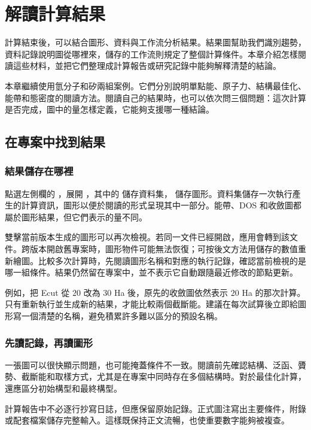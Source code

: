 \chapter{解讀計算結果}\label{ch:results}

計算結束後，可以結合圖形、資料與工作流分析結果。結果圖幫助我們識別趨勢，資料記錄說明圖從哪裡來，儲存的工作流則規定了整個計算條件。本章介紹怎樣閱讀這些材料，並把它們整理成計算報告或研究記錄中能夠解釋清楚的結論。

本章繼續使用氫分子和矽兩組案例。它們分別說明單點能、原子力、結構最佳化、能帶和態密度的閱讀方法。閱讀自己的結果時，也可以依次問三個問題：這次計算是否完成，圖中的量怎樣定義，它能夠支援哪一種結論。

\section{在專案中找到結果}

\subsection{結果儲存在哪裡}

點選左側欄的 ，展開 ，其中的  儲存資料集， 儲存圖形。資料集儲存一次執行產生的計算資訊，圖形以便於閱讀的形式呈現其中一部分。能帶、DOS 和收斂圖都屬於圖形結果，但它們表示的量不同。

雙擊當前版本生成的圖形可以再次檢視。若同一文件已經開啟，應用會轉到該文件。跨版本開啟舊專案時，圖形物件可能無法恢復；可按後文方法用儲存的數值重新繪圖。比較多次計算時，先閱讀圖形名稱和對應的執行記錄，確認當前檢視的是哪一組條件。結果仍然留在專案中，並不表示它自動跟隨最近修改的節點更新。

例如，把 Ecut 從 $20$ 改為 $30$ Ha 後，原先的收斂圖依然表示 $20$ Ha 的那次計算。只有重新執行並生成新的結果，才能比較兩個截斷能。建議在每次試算後立即給圖形寫一個清楚的名稱，避免積累許多難以區分的預設名稱。

\subsection{先讀記錄，再讀圖形}

一張圖可以很快顯示問題，也可能掩蓋條件不一致。閱讀前先確認結構、泛函、贗勢、截斷能和取樣方式，尤其是在專案中同時存在多個結構時。對於最佳化計算，還應區分初始構型和最終構型。

計算報告中不必逐行抄寫日誌，但應保留原始記錄。正式圖注寫出主要條件，附錄或配套檔案儲存完整輸入。這樣既保持正文流暢，也使重要數字能夠被複查。

